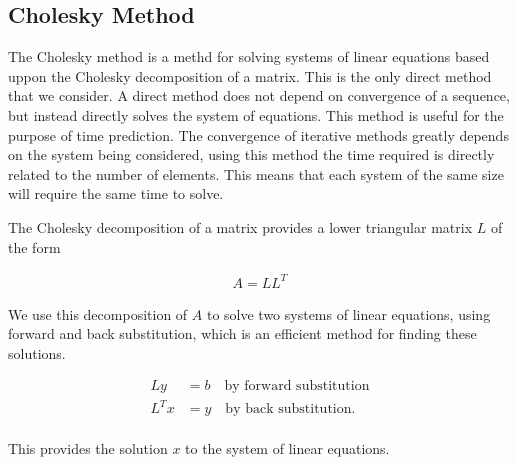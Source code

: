 \documentclass[../fem.tex]{subfiles}
\begin{document}
\subsection{Cholesky Method}%
\label{sub:cholesky_method}

The Cholesky method is a methd for solving systems of linear equations based
uppon the Cholesky decomposition of a matrix. This is the only direct method
that we consider. A direct method does not depend on convergence of a sequence,
but instead directly solves the system of equations. This method is useful for
the purpose of time prediction. The convergence of iterative methods greatly
depends on the system being considered, using this method the time required is
directly related to the number of elements. This means that each system of the
same size will require the same time to solve.


\begin{Figure}
   \begin{center}
     
   \end{center}
   \label{fig:ch_time}
\end{Figure}

The Cholesky decomposition of a matrix provides a lower triangular matrix $L$
of the form

\begin{align*}
   A=LL^T
\end{align*}

We use this decomposition of $A$ to solve two systems of linear equations,
using forward and back substitution, which is an efficient method for finding
these solutions.

\begin{align*}
  Ly&=b\quad\text{by forward substitution}\\
  L^Tx&=y\quad\text{by back substitution}.\\
\end{align*}

This provides the solution $x$ to the system of linear equations.

\begin{Figure}
   \begin{center}
     
   \end{center}
   \label{fig:ch_err}
\end{Figure}
\end{document}
